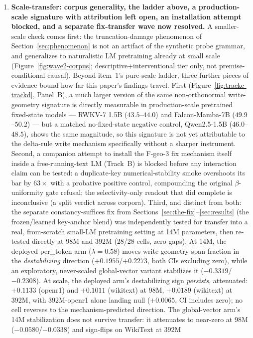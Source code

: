 \begin{enumerate}
\item \textbf{Scale-transfer: corpus generality, the ladder above, a
production-scale signature with attribution left open, an installation
attempt blocked, and a separate fix-transfer wave now resolved.} A
smaller-scale check comes first: the truncation-damage phenomenon of
Section~\ref{sec:phenomenon} is not an artifact of the synthetic probe
grammar, and generalizes to naturalistic LM pretraining already at small
scale (Figure~\ref{fig:wave2-corpus}; descriptive+interventional tier
only, not premise-conditional causal). Beyond item~1's pure-scale ladder,
three further pieces of evidence bound how far this paper's findings
travel. First (Figure~\ref{fig:trackc-trackd}, Panel~B), a much
larger version of the same non-orthonormal write-geometry signature is
directly measurable in production-scale pretrained fixed-state models ---
RWKV-7 1.5B ($43.5$--$44.0$) and Falcon-Mamba-7B ($49.9$--$50.2$) --- but
a matched no-fixed-state negative control, Qwen2.5-1.5B
($46.0$--$48.5$), shows the same magnitude, so this signature is not yet
attributable to the delta-rule write mechanism specifically without a
sharper instrument. Second, a companion attempt to install the F-geo-3
fix mechanism itself inside a free-running-text LM (Track~B) is blocked
before any interaction claim can be tested: a duplicate-key
numerical-stability smoke overshoots its bar by $63\times$ with a
probative positive control, compounding the original $\beta$-uniformity
gate refusal; the selectivity-only readout that did complete is
inconclusive (a split verdict across corpora). Third, and distinct from
both: the separate constancy-suffices fix from
Sections~\ref{sec:the-fix}--\ref{sec:results} (the frozen/learned
key-anchor blend) was independently tested for transfer into a real,
from-scratch small-LM pretraining setting at 14M
parameters, then re-tested directly at 98M and 392M (28/28 cells,
zero gaps). At 14M, the deployed per\_token arm ($\lambda{=}0.58$) moves
write-geometry span-fraction in the \emph{destabilizing} direction
($+0.1955$/$+0.2273$, both CIs excluding zero), while an exploratory,
never-scaled global-vector variant stabilizes it
($-0.3319$/$-0.2308$). At scale, the deployed arm's destabilizing sign
\emph{persists}, attenuated: $+0.1133$ (openr1) and $+0.1011$
(wikitext) at 98M, $+0.0189$ (wikitext) at 392M, with 392M-openr1 alone
landing null ($+0.0065$, CI includes zero); no cell reverses to the
mechanism-predicted direction. The global-vector arm's 14M stabilization
does not survive transfer: it attenuates to near-zero at 98M
($-0.0580$/$-0.0338$) and sign-flips on WikiText at 392M

\end{enumerate}
